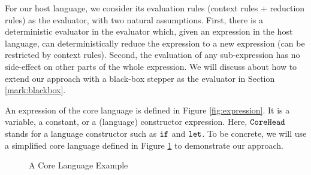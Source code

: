 For our host language, we consider its evaluation rules (context rules + reduction rules) as the evaluator, with two natural assumptions. First, there is a deterministic evaluator in the evaluator which, given an expression in the host language, can deterministically reduce the expression to a new expression (can be restricted by context rules). Second, the evaluation of any sub-expression has no side-effect on other parts of the whole expression. We will discuss about how to extend our approach with a black-box stepper as the evaluator in Section \ref{mark:blackbox}.

An expression of the core language is defined in Figure \ref{fig:expression}. It is a variable, a constant, or a (language) constructor expression. Here, $\mbox{\tt CoreHead}$ stands for a language constructor such as $\mbox{\tt if}$ and $\mbox{\tt let}$. To be concrete, we will use a simplified core language defined in Figure \ref{fig:core} to demonstrate our approach. 

\begin{figure}[thb]
\begin{centering}
	\framebox[36em][c]{
		\parbox[t]{33em}{
			\[
			\begin{array}{lcl}
			\m{CoreExp} &::=& \Code{(CoreExp~CoreExp~...)} ~~\note{// apply}\\
			&|& \m{(lambda~(x~...)~CoreExp)} ~~\note{// call-by-value}\\
			&|& \m{(lambdaN~(x~...)~CoreExp)} ~~\note{// call-by-need}\\
			&|& \m{(if~CoreExp~CoreExp~CoreExp)}\\
			&|& \m{(let~(x~CoreExp)~CoreExp)}\\
			&|& \m{(first~CoreExp)}\\
			&|& \m{(empty?~CoreExp)}\\
			&|& \m{(rest~CoreExp)}\\
			&|& \m{(cons~CoreExp~CoreExp)}\\
			&|& \m{(arithop~CoreExp~CoreExp)} ~~\note{// +, -, *, /, >, <, =}\\
			&|& \m{x}\\
			&|& \m{c} ~~\note{// boolean, number and list}
			\end{array}
			\]
		}
	}
\end{centering}
\caption{A Core Language Example}
\label{fig:core}
\end{figure}



